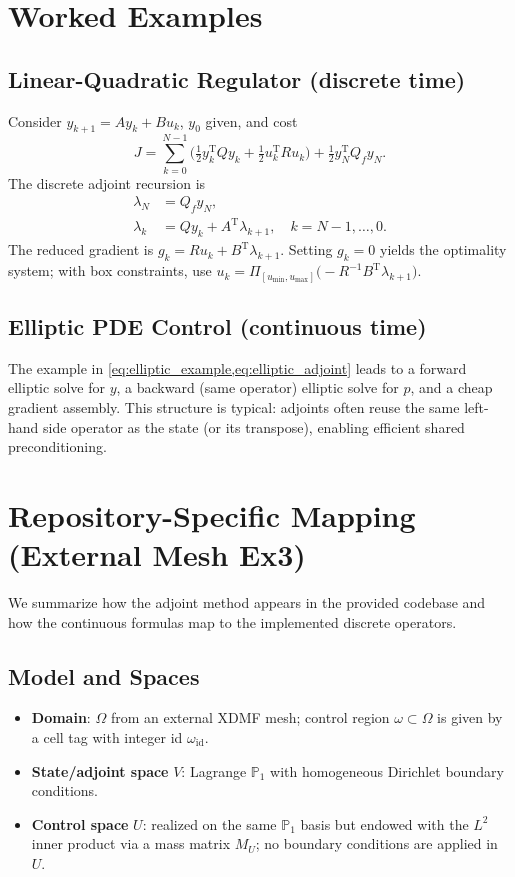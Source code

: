 \documentclass[11pt,a4paper]{article}
\numberwithin{equation}{section}
\theoremstyle{plain}
\theoremstyle{definition}
\newcommand{\T}{\mathrm{T}}
\begin{document}
\section{Worked Examples}
\subsection{Linear-Quadratic Regulator (discrete time)}
Consider $y_{k+1} = A y_k + B u_k$, $y_0$ given, and cost
\begin{equation}
J = \sum_{k=0}^{N-1} \Big( \tfrac{1}{2} y_k^\T Q y_k + \tfrac{1}{2} u_k^\T R u_k \Big) + \tfrac{1}{2} y_N^\T Q_f y_N.
\end{equation}
The discrete adjoint recursion is
\begin{subequations}
\begin{align}
\lambda_N &= Q_f y_N, \\
\lambda_k &= Q y_k + A^\T \lambda_{k+1}, \quad k=N-1,\dots,0.
\end{align}
\end{subequations}
The reduced gradient is $g_k = R u_k + B^\T \lambda_{k+1}$. Setting $g_k=0$ yields the optimality system; with box constraints, use $u_k=\Pi_{[u_{\min},u_{\max}]}\big(-R^{-1} B^\T \lambda_{k+1}\big)$.

\subsection{Elliptic PDE Control (continuous time)}
The example in \cref{eq:elliptic_example,eq:elliptic_adjoint} leads to a forward elliptic solve for $y$, a backward (same operator) elliptic solve for $p$, and a cheap gradient assembly. This structure is typical: adjoints often reuse the same left-hand side operator as the state (or its transpose), enabling efficient shared preconditioning.

\section{Repository-Specific Mapping (External Mesh Ex3)}
\label{sec:repo_mapping}
We summarize how the adjoint method appears in the provided codebase and how the continuous formulas map to the implemented discrete operators.

\subsection{Model and Spaces}
\begin{itemize}
  \item \textbf{Domain}: $\Omega$ from an external XDMF mesh; control region $\omega \subset \Omega$ is given by a cell tag with integer id $\omega_{\text{id}}$.
  \item \textbf{State/adjoint space} $V$: Lagrange $\mathbb{P}_1$ with homogeneous Dirichlet boundary conditions.
  \item \textbf{Control space} $U$: realized on the same $\mathbb{P}_1$ basis but endowed with the $L^2$ inner product via a mass matrix $M_U$; no boundary conditions are applied in $U$.
\end{itemize}
\end{document}
